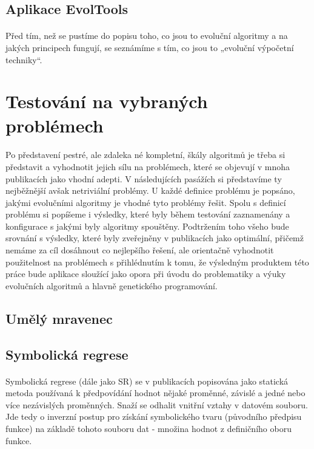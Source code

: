 \documentclass[bc,male,java,dept460]{diploma}		%
\begin{document}
\subsection{Aplikace EvolTools}
\paragraph*{}
Před tím, než se pustíme do popisu toho, co jsou to evoluční algoritmy a na jakých principech fungují, se seznámíme s tím, co jsou to „evoluční výpočetní techniky“.

\section{Testování na vybraných problémech}
\paragraph*{}
Po představení pestré, ale zdaleka né kompletní, škály algoritmů je třeba si představit a vyhodnotit jejich sílu na problémech, které se objevují v mnoha publikacích jako vhodní adepti. V následujících pasážích si představíme ty nejběžnější avšak netriviální problémy. U každé definice problému je popsáno, jakými evolučními algoritmy je vhodné tyto problémy řešit. Spolu s definicí problému si popíšeme i výsledky, které byly během testování zaznamenány a konfigurace s jakými byly algoritmy spouštěny. Podtržením toho všeho bude srovnání s výsledky, které byly zveřejněny v publikacích jako optimální, přičemž nemáme za cíl dosáhnout co nejlepšího řešení, ale orientačně vyhodnotit použitelnost na problémech s přihlédnutím k tomu, že výsledným produktem této práce bude aplikace sloužící jako opora při úvodu do problematiky a výuky evolučních algoritmů a hlavně genetického programování.

\subsection{Umělý mravenec}
\paragraph*{}


\subsection{Symbolická regrese}
\paragraph*{}
Symbolická regrese (dále jako SR) se v publikacích popisována jako statická metoda používaná k předpovídání hodnot nějaké proměnné, závislé a jedné nebo více nezávislých proměnných. Snaží se odhalit vnitřní vztahy v datovém souboru. Jde tedy o inverzní postup pro získání symbolického tvaru (původního předpisu funkce) na základě tohoto souboru dat - množina hodnot z definičního oboru funkce. 
\end{document}
